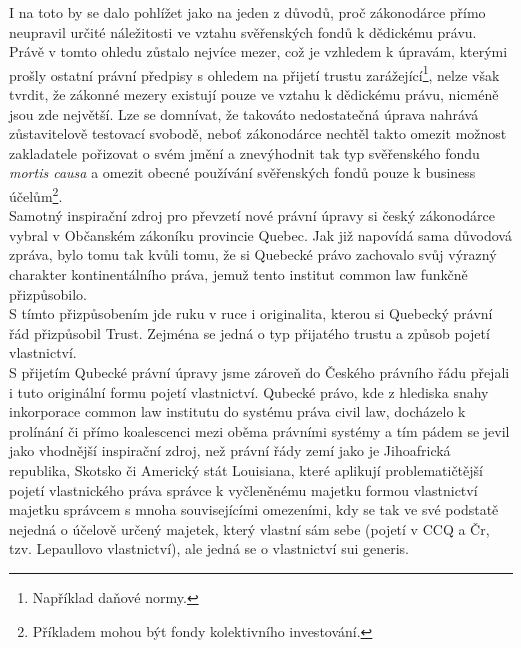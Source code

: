 \documentclass{article}
\begin{document}
I na toto by se dalo pohlížet jako na jeden z důvodů, proč zákonodárce přímo neupravil určité náležitosti ve vztahu svěřenských fondů k dědickému právu. Právě v tomto ohledu zůstalo nejvíce mezer, což je vzhledem k úpravám, kterými prošly ostatní právní předpisy s ohledem na přijetí trustu zarážející\footnote{Například daňové normy.}, nelze však tvrdit, že zákonné mezery existují pouze ve vztahu k dědickému právu, nicméně jsou zde největší. Lze se domnívat, že takováto nedostatečná úprava nahrává zůstavitelově testovací svobodě, neboť zákonodárce nechtěl takto omezit možnost zakladatele pořizovat o svém jmění a znevýhodnit tak typ svěřenského fondu \textit{mortis causa} a omezit obecné používání svěřenských fondů pouze k business účelům\footnote{Příkladem mohou být fondy kolektivního investování.}.\\

Samotný inspirační zdroj pro převzetí nové právní úpravy si český zákonodárce vybral v Občanském zákoníku provincie Quebec. Jak již napovídá sama důvodová zpráva, bylo tomu tak kvůli tomu, že si Quebecké právo zachovalo svůj výrazný charakter kontinentálního práva, jemuž tento institut common law funkčně přizpůsobilo.\\

S tímto přizpůsobením jde ruku v ruce i originalita, kterou si Quebecký právní řád přizpůsobil Trust. Zejména se jedná o typ přijatého trustu a způsob pojetí vlastnictví.\\

S přijetím Qubecké právní úpravy jsme zároveň do Českého právního řádu přejali i tuto originální formu pojetí vlastnictví. Qubecké právo, kde z hlediska snahy inkorporace common law institutu do systému práva civil law, docházelo k prolínání či přímo koalescenci mezi oběma právními systémy a tím pádem se jevil jako vhodnější inspirační zdroj, než právní řády zemí jako je Jihoafrická republika, Skotsko či Americký stát Louisiana, které aplikují problematičtější pojetí vlastnického práva správce k vyčleněnému majetku formou vlastnictví majetku správcem s mnoha souvisejícími omezeními, kdy se tak ve své podstatě nejedná o účelově určený majetek, který vlastní sám sebe (pojetí v CCQ a Čr, tzv. Lepaullovo vlastnictví), ale jedná se o vlastnictví sui generis.\\

\end{document}
